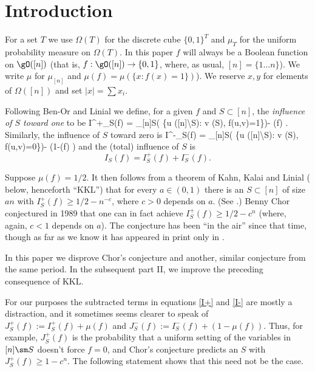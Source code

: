 
%
%
%


\section {Introduction}\label{Intro}

\mn


For a set $T$ we use $\Omega(T)$ for the discrete cube
$\{0,1\}^T$ and $\mu_T$ for the uniform probability measure
on $\Omega (T)$.
In this paper
$f$ will always be a Boolean function on $\gO([n])$
(that is, $f:\gO([n]) \to \{0,1\}$, where, as usual,
$[n]=\{1\dots n\}$).
We write $\mu$ for $\mu_{[n]}$ and
$\mu(f)= \mu (\{ x:f(x)= 1 \})$).
We reserve $x,y$ for elements of $\Omega([n])$
and set $|x| = \sum x_i$.





Following Ben-Or and Linial \cite {bl} we define,
for a given $f$ and
$S \subset [n]$, the \emph{influence of $S$ toward one}
to be
I^+_S(f) = \mu_{[n]\sm S}( \{u \in \Omega ([n]\backslash S):
\exists v \in \Omega(S), f(u,v)=1\})- \mu(f) .
\enq
Similarly, the influence of $S$ toward zero is
I^-_S(f) = \mu_{[n]\sm S}( \{u \in \Omega ([n]\backslash S):
\exists v \in \Omega(S), f(u,v)=0\})- (1-\mu(f) )
\enq
and the (total) influence of $S$ is
$$I_S(f)=I_S^+(f)+I_S^-(f).$$


Suppose $\mu(f) =1/2$.
It then follows from a theorem of Kahn, Kalai and Linial
\cite{kkl}
( below, henceforth ``KKL'')
that for every $a\in (0,1) $ there is an $S \subset [n]$ of size
$an$ with
$I^+_S(f)\ge 1/2-n^{-c}$, where $c>0$ depends on $a$.
(See .)
Benny Chor conjectured in 1989 \cite {benny} that one can in fact
achieve
$I^+_S(f)\ge 1/2-c^n$ (where, again, $c<1$ depends on $a$).
The conjecture has been ``in the air'' since that time,
though as far as we know
it has appeared in print only in
\cite{k:nati,Nati}.

%
In this paper we disprove
Chor's conjecture and another, similar conjecture
from the same period. In the subsequent part II,
we improve the preceding consequence of KKL.

For our purposes the subtracted terms in
equations %
%
\eqref{I+} and
\eqref{I-} are mostly a distraction, and it sometimes seems
clearer to speak of $J^+_S(f):=I^+_S(f)+\mu(f) $
and $J^-_S(f):=I^-_S(f)+(1-\mu(f) )$.
Thus, for example, $J^+_S(f)$ is the probability that
a uniform setting of the variables in $[n]\sm S$
doesn't force $f=0$, and Chor's conjecture predicts
an $S$ with $J^+_S(f)\ge 1-c^n$.
The following statement shows that this need not be the case.

